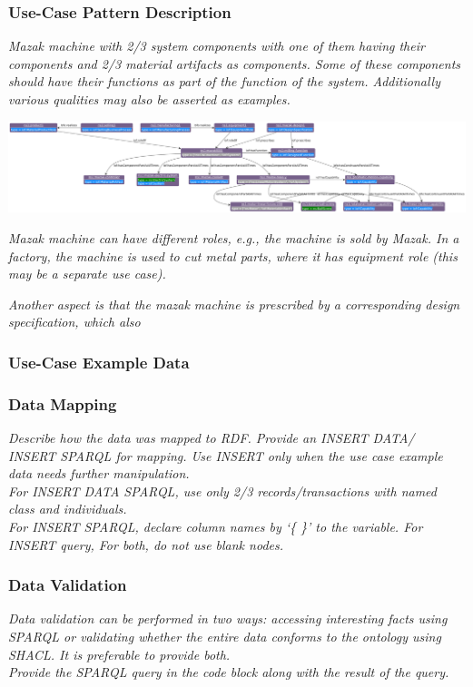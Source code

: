 \subsubsection*{Use-Case Pattern Description}

\textit{Mazak machine with 2/3 system components with one of them having their components and 2/3 material artifacts as components. Some of these components should have their functions as part of the function of the system. Additionally various qualities may also be asserted as examples.}

\includegraphics[scale=0.26]{scenarios/engineered-system-artifact/images/mazak.png}
 
\textit{Mazak machine can have different roles, e.g., the machine is sold by Mazak. In a factory, the machine is used to cut metal parts, where it has equipment role (this may be a separate use case).}

\textit{Another aspect is that the mazak machine is prescribed by a corresponding design specification, which also }

\subsubsection*{Use-Case Example Data}

\subsubsection*{Data Mapping}
 \textit{ 
Describe how the data was mapped to RDF. Provide an INSERT DATA/ INSERT SPARQL for mapping. Use INSERT only when the use case example data needs further manipulation. \\
For INSERT DATA SPARQL, use only 2/3 records/transactions with named class and individuals. \\
For INSERT SPARQL, declare column names by `\{ \}' to the variable.  
For INSERT query, 
For both, do not use blank nodes.    
  }

\subsubsection*{Data Validation}
 \textit{ 
Data validation can be performed in two ways: accessing interesting facts using SPARQL or validating whether the entire data conforms to the ontology using SHACL. It is preferable to provide both. \\
Provide the SPARQL query in the code block along with the result of the query. \\
  }
